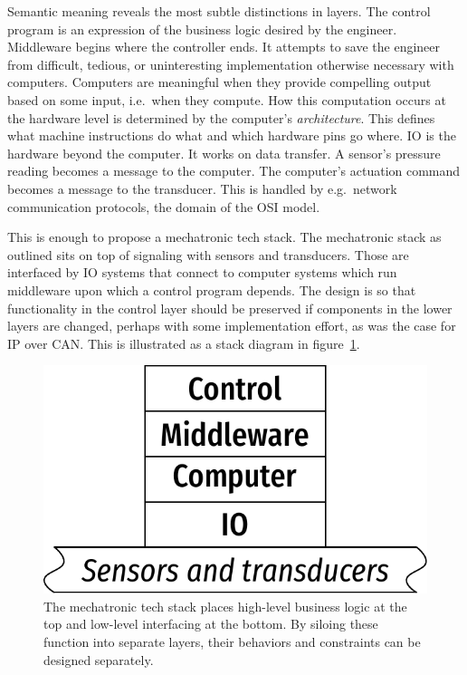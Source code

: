 \documentclass[english,12pt,a4paper,pdftex,eng,utf8]{aaltothesis}
\begin{document}
Semantic meaning reveals the most subtle distinctions in layers. The control program is an expression of the business logic desired by the engineer. Middleware begins where the controller ends. It attempts to save the engineer from difficult, tedious, or uninteresting implementation otherwise necessary with computers. Computers are meaningful when they provide compelling output based on some input, i.e.\ when they compute. How this computation occurs at the hardware level is determined by the computer's \textit{architecture}. This defines what machine instructions do what and which hardware pins go where. IO is the hardware beyond the computer. It works on data transfer. A sensor's pressure reading becomes a message to the computer. The computer's actuation command becomes a message to the transducer. This is handled by e.g.\ network communication protocols, the domain of the OSI model.

This is enough to propose a mechatronic tech stack. The mechatronic stack as outlined sits on top of signaling with sensors and transducers. Those are interfaced by IO systems that connect to computer systems which run middleware upon which a control program depends. The design is so that functionality in the control layer should be preserved if components in the lower layers are changed, perhaps with some implementation effort, as was the case for IP over CAN.  This is illustrated as a stack diagram in figure~\ref{fig:mechatronic_tech_stack}.

\begin{figure}[h]
  \centering
  \includegraphics[width=\textwidth]{assets/mechatronic_tech_stack}
  \caption{The mechatronic tech stack places high-level business logic at the top and low-level interfacing at the bottom.  By siloing these function into separate layers, their behaviors and constraints can be designed separately.}\label{fig:mechatronic_tech_stack}
\end{figure}
\end{document}
